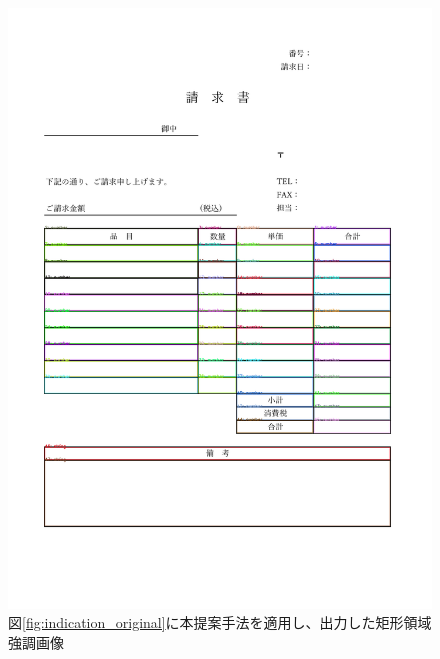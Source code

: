 \begin{figure}[t]
    \begin{center}
        \includegraphics[width=15cm]{image/05-indication/rects_with_label.png}
        \caption{図\ref{fig:indication_original}に本提案手法を適用し、出力した矩形領域強調画像}
        \label{fig:exported_png}
    \end{center}
\end{figure}